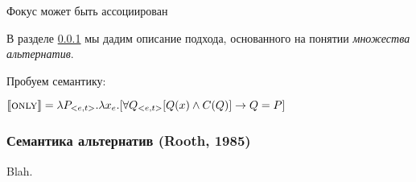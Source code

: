 \documentclass[a4paper, titlepage, 12pt]{article}
\begin{document}
\medskip

Фокус может быть ассоциирован 

В разделе \ref{alternativeSemantics} мы дадим описание подхода, основанного на понятии \textit{множества альтернатив}.

Пробуем семантику:

\begin{exe}
    \ex $ \llbracket \textsc{only} \rrbracket = \lambda P_{<e,t>}.\lambda x_{e}.[ \forall Q_{<e,t>} [Q(x) \land C(Q)] \rightarrow Q = P ]$
\end{exe}

\subsubsection{Семантика альтернатив (Rooth, 1985)} \label{alternativeSemantics}

Blah.

 

\end{document}
